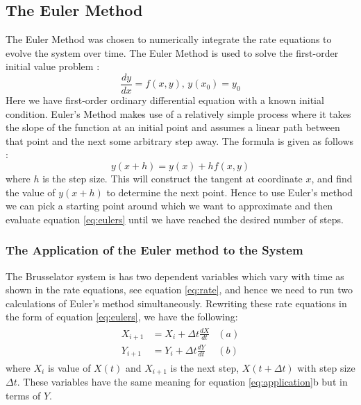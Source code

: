 \documentclass[reprint, amsmath, amssymb, aps]{revtex4-2}
\begin{document}
\subsection{The Euler Method}
The Euler Method was chosen to numerically integrate the rate equations to evolve the system over time. The Euler Method is used to solve the first-order initial value problem \cite{eulerError}:
\begin{equation}
	\frac{dy}{dx} = f\left(x, y \right),\, y(x_0) = y_0
\end{equation}Here we have first-order ordinary differential equation with a known initial condition. Euler's Method makes use of a relatively simple process where it takes the slope of the function at an initial point and assumes a linear path between that point and the next some arbitrary step away. The formula is given as follows \cite{paulsNotes}:
\begin{equation}
	y(x+h) = y(x) + h f(x, y)
	\label{eq:eulers}
\end{equation}where $h$ is the step size. This will construct the tangent at coordinate $x$, and find the value of $y(x+h)$ to determine the next point. Hence to use Euler's method we can pick a starting point around which we want to approximate and then evaluate equation \ref{eq:eulers} until we have reached the desired number of steps.

\subsubsection{The Application of the Euler method to the System}

The Brusselator system is has two dependent variables which vary with time as shown in the rate equations, see equation \ref{eq:rate}, and hence we need to run two calculations of Euler's method simultaneously. Rewriting these rate equations in the form of equation \ref{eq:eulers}, we have the following:
\begin{align}
	\begin{aligned}
	X_{i+1} &= X_i + \Delta t \frac{dX}{dt} & (a)\\
	Y_{i+1} &= Y_i + \Delta t \frac{dY}{dt} & (b)
	\end{aligned}
	\label{eq:application}
\end{align}where $X_{i}$ is value of $X(t)$ and $X_{i+1}$ is the next step, $X(t+\Delta t)$ with step size $\Delta t$. These variables have the same meaning for equation \ref{eq:application}b but in terms of $Y$.
\end{document}
